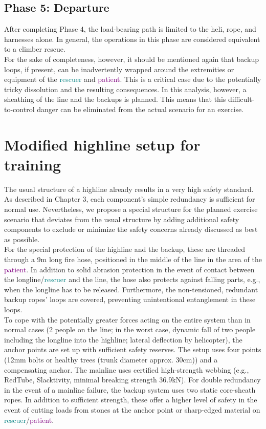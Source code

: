 \documentclass[a4paper,10pt]{scrartcl}
\begin{document}
\clearpage
\subsection{Phase 5: Departure}
\label{sec:fha:phase5}

After completing Phase 4, the load-bearing path is limited to the heli, rope, and harnesses alone. In general, the operations in this phase are considered equivalent to a climber rescue.\\
For the sake of completeness, however, it should be mentioned again that backup loops, if present, can be inadvertently wrapped around the extremities or equipment of the \textcolor{teal}{rescuer} and \textcolor{purple}{patient}. This is a critical case due to the potentially tricky dissolution and the resulting consequences. In this analysis, however, a sheathing of the line and the backups is planned. This means that this difficult-to-control danger can be eliminated from the actual scenario for an exercise.

\section{Modified highline setup for training}
\label{sec:modified}

The usual structure of a highline already results in a very high safety standard. As described in Chapter 3, each component's simple redundancy is sufficient for normal use. Nevertheless, we propose a special structure for the planned exercise scenario that deviates from the usual structure by adding additional safety components to exclude or minimize the safety concerns already discussed as best as possible.\\
For the special protection of the highline and the backup, these are threaded through a 9m long fire hose, positioned in the middle of the line in the area of the \textcolor{purple}{patient}. In addition to solid abrasion protection in the event of contact between the longline/\textcolor{teal}{rescuer} and the line, the hose also protects against falling parts, e.g., when the longline has to be released.
Furthermore, the non-tensioned, redundant backup ropes' loops are covered, preventing unintentional entanglement in these
loops.\\

To cope with the potentially greater forces acting on the entire system than in normal cases (2 people on the line; in the worst case, dynamic fall of two people including the longline into the highline; lateral deflection by helicopter), the anchor points are set up with sufficient safety reserves. The setup uses four points (12mm bolts or healthy trees (trunk diameter approx. 30cm)) and a compensating anchor. The mainline uses certified high-strength webbing (e.g., RedTube, Slacktivity, minimal breaking strength 36.9kN). For double redundancy in the event of a mainline failure, the backup system uses two static core-sheath ropes. In addition to sufficient strength, these offer a higher level of safety in the event of cutting loads from stones at the anchor point or sharp-edged material on \textcolor{teal}{rescuer}/\textcolor{purple}{patient}. \\
\end{document}

